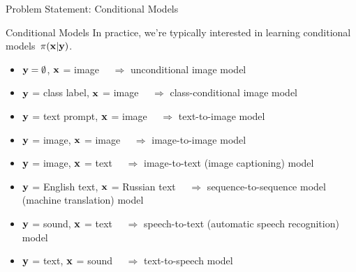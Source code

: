 \documentclass{beamer}
\begin{document}
\begin{frame}{Problem Statement: Conditional Models}
	\begin{block}{Conditional Models}
		In practice, we're typically interested in learning conditional models~$\pi(\mathbf{x} | \mathbf{y})$. 
            \eqpause
		\begin{itemize}
			\item $\mathbf{y} = \emptyset$, $\mathbf{x}$ = image $\quad\Rightarrow$ unconditional image model
			\item $\mathbf{y}$ = class label, $\mathbf{x}$ = image $\quad\Rightarrow$ class-conditional image model
			\item $\mathbf{y}$ = text prompt, $\mathbf{x}$ = image $\quad\Rightarrow$ text-to-image model
			\item $\mathbf{y}$ = image, $\mathbf{x}$ = image $\quad\Rightarrow$ image-to-image model
			\item $\mathbf{y}$ = image, $\mathbf{x}$ = text $\quad\Rightarrow$ image-to-text (image captioning) model
			\item $\mathbf{y}$ = English text, $\mathbf{x}$ = Russian text $\quad\Rightarrow$ sequence-to-sequence model (machine translation) model
			\item $\mathbf{y}$ = sound, $\mathbf{x}$ = text $\quad\Rightarrow$ speech-to-text (automatic speech recognition) model
			\item $\mathbf{y}$ = text, $\mathbf{x}$ = sound $\quad\Rightarrow$ text-to-speech model
		\end{itemize}
	\end{block}
\end{frame}
\end{document}
